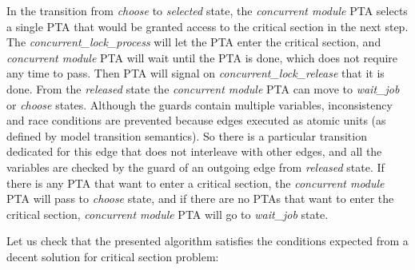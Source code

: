 \par In the transition from \textcolor{ColorUppaalState}{\textit{choose}} to \textcolor{ColorUppaalState}{\textit{selected}} state, the \textit{concurrent module} PTA selects a single PTA that would be granted access to the critical section in the next step. The \textcolor{ColorUppaalChannel}{\textit{concurrent_lock_process}} will let the PTA enter the critical section, and \textit{concurrent module} PTA will wait until the PTA is done, which does not require any time to pass. Then PTA will signal on \textcolor{ColorUppaalChannel}{\textit{concurrent_lock_release}} that it is done. From the \textcolor{ColorUppaalState}{\textit{released}} state the \textit{concurrent module} PTA can move to \textcolor{ColorUppaalState}{\textit{wait_job}} or \textcolor{ColorUppaalState}{\textit{choose}} states. Although the guards contain multiple variables, inconsistency and race conditions are prevented because edges executed as atomic units (as defined by model transition semantics). So there is a particular transition dedicated for this edge that does not interleave with other edges, and all the variables are checked by the guard of an outgoing edge from \textcolor{ColorUppaalState}{\textit{released}} state. If there is any PTA that want to enter a critical section, the \textit{concurrent module} PTA will pass to \textcolor{ColorUppaalState}{\textit{choose}} state, and if there are no PTAs that want to enter the critical section, \textit{concurrent module} PTA will go to \textcolor{ColorUppaalState}{\textit{wait_job}} state.
\par Let us check that the presented algorithm satisfies the conditions expected from a decent solution for critical section problem:

